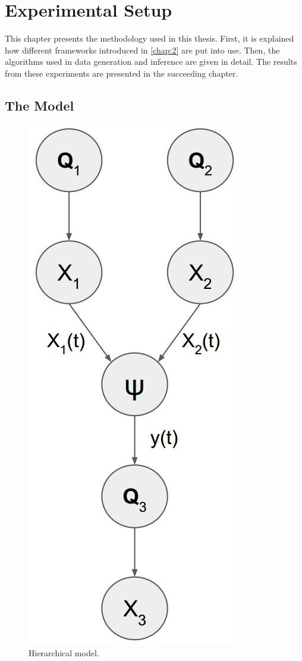 %
\chapter{Experimental Setup}
\label{chap:3}

This chapter presents the methodology used in this thesis. First, it is explained how different frameworks introduced in \cref{chap:2} are put into use. Then, the algorithms used in data generation and inference are given in detail. The results from these experiments are presented in the succeeding chapter.

\section{The Model}
\begin{figure}
	\centering
	\includegraphics[width=0.7\linewidth]{figures/h_model}
	\caption{Hierarchical model.}
	\label{fig:h_model}
\end{figure} 

